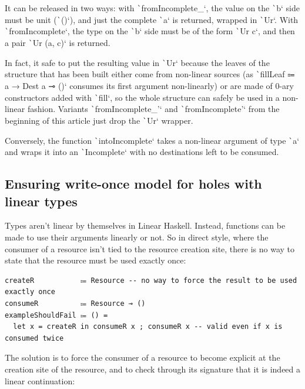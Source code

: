 \documentclass[english]{jflart}
\newlength{\currentparskip}
\newenvironment{unbreakable}
{%
  \setlength{\currentparskip}{\parskip}%
  \setlength{\parskip}{\currentparskip}%
  \par\vspace{0.5\baselineskip}%
  \noindent\begin{minipage}{\textwidth}%
    \setlength{\parskip}{\currentparskip}%
}
{%
  \end{minipage}%
  \par\vspace{0.5\baselineskip}%
}
\begin{document}
It can be released in two ways: with \texttt`fromIncomplete_`, the value on the \texttt`b` side must be unit (\texttt`()`), and just the complete \texttt`a` is returned, wrapped in \texttt`Ur`. With \texttt`fromIncomplete`, the type on the \texttt`b` side must be of the form \texttt`Ur c`, and then a pair \texttt`Ur (a, c)` is returned.

In fact, it safe to put the resulting value in \texttt`Ur` because the leaves of the structure that has been built either come from non-linear sources (as \texttt`fillLeaf ⩴ a → Dest a ⊸ ()` consumes its first argument non-linearly) or are made of 0-ary constructors added with \texttt`fill`, so the whole structure can safely be used in a non-linear fashion. Variants \texttt`fromIncomplete_'` and \texttt`fromIncomplete'` from the beginning of this article just drop the \texttt`Ur` wrapper.

Conversely, the function \texttt`intoIncomplete` takes a non-linear argument of type \texttt`a` and wraps it into an \texttt`Incomplete` with no destinations left to be consumed.

\subsection{Ensuring write-once model for holes with linear types}\label{ssec:api-linearity}

Types aren't linear by themselves in Linear Haskell. Instead, functions can be made to use their arguments linearly or not. So in direct style, where the consumer of a resource isn't tied to the resource creation site, there is no way to state that the resource must be used exactly once:

\begin{unbreakable}
{\small
\begin{verbatim}
createR           ⩴ Resource -- no way to force the result to be used exactly once
consumeR          ⩴ Resource ⊸ ()
exampleShouldFail ⩴ () =      
  let x = createR in consumeR x ; consumeR x -- valid even if x is consumed twice
\end{verbatim}
}
\end{unbreakable}

The solution is to force the consumer of a resource to become explicit at the creation site of the resource, and to check through its signature that it is indeed a linear continuation:
\end{document}

